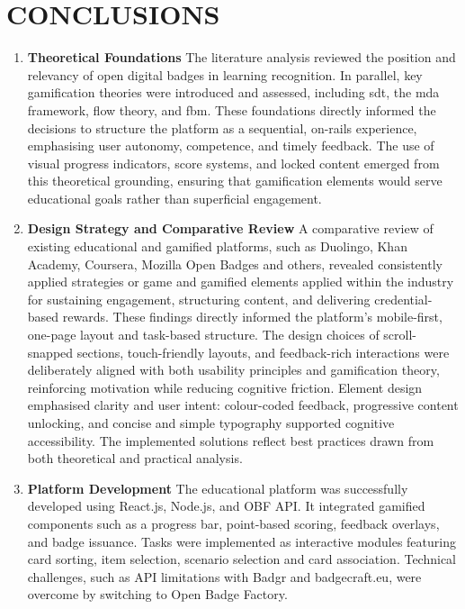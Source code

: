 \section*{CONCLUSIONS}
\begin{enumerate}
    \item \textbf{Theoretical Foundations} The literature analysis reviewed the position and relevancy of open digital badges in learning recognition. 
    In parallel, key gamification theories were introduced and assessed, including \acrshort{sdt}, the \acrshort{mda} framework, flow theory, and \acrshort{fbm}. 
    These foundations directly informed the decisions to structure the platform as a sequential, on-rails experience, emphasising user autonomy, competence, and timely feedback. 
    The use of visual progress indicators, score systems, and locked content emerged from this theoretical grounding, ensuring that gamification elements would serve educational goals rather than superficial engagement.
    \item \textbf{Design Strategy and Comparative Review} A comparative review of existing educational and gamified platforms, such as Duolingo, Khan Academy, Coursera, Mozilla Open Badges and others, revealed consistently applied strategies or game and gamified elements applied within the industry for sustaining engagement, structuring content, and delivering credential-based rewards. 
    These findings directly informed the platform’s mobile-first, one-page layout and task-based structure. 
    The design choices of scroll-snapped sections, touch-friendly layouts, and feedback-rich interactions were deliberately aligned with both usability principles and gamification theory, reinforcing motivation while reducing cognitive friction. 
    Element design emphasised clarity and user intent: colour-coded feedback, progressive content unlocking, and concise and simple typography supported cognitive accessibility.
    The implemented solutions reflect best practices drawn from both theoretical and practical analysis.
    \item \textbf{Platform Development} The educational platform was successfully developed using React.js, Node.js, and OBF API. 
    It integrated gamified components such as a progress bar, point-based scoring, feedback overlays, and badge issuance. 
    Tasks were implemented as interactive modules featuring card sorting, item selection, scenario selection and card association. 
    Technical challenges, such as API limitations with Badgr and badgecraft.eu, were overcome by switching to Open Badge Factory.

\end{enumerate}
